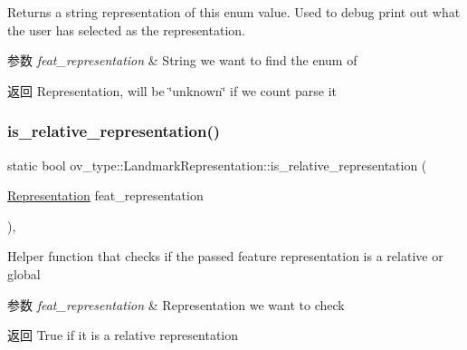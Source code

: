 Returns a string representation of this enum value. Used to debug print out what the user has selected as the representation. 


\begin{DoxyParams}{参数}
{\em feat\+\_\+representation} & String we want to find the enum of \\
\hline
\end{DoxyParams}
\begin{DoxyReturn}{返回}
Representation, will be \char`\"{}unknown\char`\"{} if we coun\textquotesingle{}t parse it 
\end{DoxyReturn}
\mbox{\label{classov__type_1_1LandmarkRepresentation_a67860ca8360c71fa8c1ae3f99a2378c1}} 
\subsubsection{\texorpdfstring{is\+\_\+relative\+\_\+representation()}{is\_relative\_representation()}}
{\footnotesize\ttfamily static bool ov\+\_\+type\+::\+Landmark\+Representation\+::is\+\_\+relative\+\_\+representation (\begin{DoxyParamCaption}\item[{\hyperlink{classov__type_1_1LandmarkRepresentation_a7f5783df6932ace7f098ae243b6d298e}{Representation}}]{feat\+\_\+representation }\end{DoxyParamCaption})\hspace{0.3cm}{\ttfamily [inline]}, {\ttfamily [static]}}



Helper function that checks if the passed feature representation is a relative or global 


\begin{DoxyParams}{参数}
{\em feat\+\_\+representation} & Representation we want to check \\
\hline
\end{DoxyParams}
\begin{DoxyReturn}{返回}
True if it is a relative representation 
\end{DoxyReturn}
